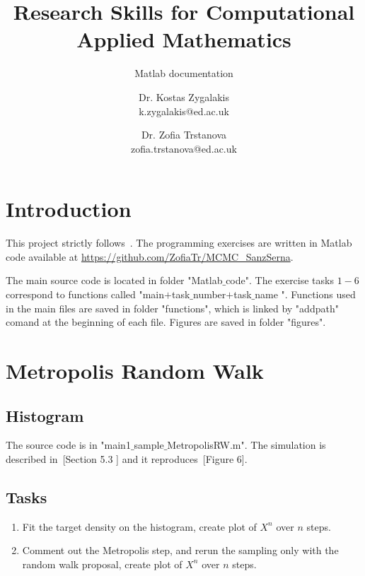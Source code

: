\documentclass{scrartcl}
\title{Research Skills for Computational Applied Mathematics}
\subtitle{Matlab documentation}
\begin{document}
\begin{titlepage}
\author{Dr. Kostas Zygalakis\\ k.zygalakis@ed.ac.uk
\and 
Dr. Zofia Trstanova\\zofia.trstanova@ed.ac.uk}


\clearpage\maketitle
\thispagestyle{empty}
\end{titlepage}

\newpage
\setcounter{page}{1}

\section{Introduction}
This project strictly follows~\cite{sanz2014markov}. The programming exercises are written in Matlab code available at \url{https://github.com/ZofiaTr/MCMC_SanzSerna}.

The main source code is located in folder "Matlab$\_$code". The exercise tasks $1-6$ correspond to functions called "main$+$task$\_$number$+$task$\_$name ". Functions used in the main files are saved in folder "functions", which is linked by "addpath" comand at the beginning of each file. Figures are saved in folder "figures".

\section{Metropolis Random Walk}

\subsection{Histogram}
The source code is in "main1$\_$sample$\_$MetropolisRW.m". The simulation is described in~\cite{sanz2014markov}[Section 5.3 ] and it reproduces~\cite{sanz2014markov}[Figure 6].

\subsection{Tasks}
\begin{enumerate}
\item Fit the target density on the histogram, create plot of $X^n$ over $n $ steps.
\item Comment out the Metropolis step, and rerun the sampling only with the random walk proposal, create plot of $X^n$ over $n $ steps.
\end{enumerate}
\end{document}
